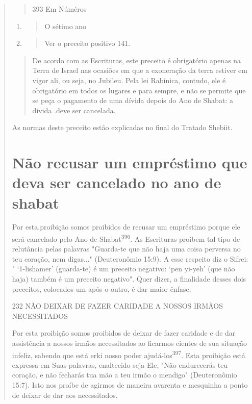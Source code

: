 \begin{quote}
\begin{quote}
393 Em Núméros
\end{quote}

\begin{enumerate}
\def\labelenumi{\arabic{enumi}.}
\setcounter{enumi}{393}
\item
 \begin{quote}
 O sétimo ano
 \end{quote}
\item
 \begin{quote}
 Ver o preceito positivo 141.
 \end{quote}
\end{enumerate}

\begin{quote}
De acordo com as Escrituras, este preceito é obrigatório apenas na Terra
de Israel nas ocasiões em que a exoneração da terra estiver em vigor
ali, ou seja, no Jubileu. Pela lei Rabínica, contudo, ele é obrigatório
em todos os lugares e para sempre, e não se permite que se peça o
pagamento de uma dívi­da depois do Ano de Shabat: a dívida .deve ser
cancelada.
\end{quote}

As normas deste preceito estão explicadas no final do Tratado Shebiit.


\section{Não recusar um empréstimo que deva ser cancelado no ano de shabat}

Por esta.proibição somos proibidos de recusar um empréstimo por­que ele
será cancelado pelo Ano de Shabat\textsuperscript{396}. As Escrituras
proíbem tal tipo de relutância pelas palavras "Guarda-te que não haja
uma coisa perversa no teu coração, nem digas..." (Deuteronômio 15:9). A
esse respeito diz o Sifrei: " `1-lis­hamer' (guarda-te) é um preceito
negativo: `pen yi-yeh' (que não haja) também é um preceito negativo".
Quer dizer, a finalidade desses dois preceitos, coloca­dos um após o
outro, é dar maior ênfase.

232 NÃO DEIXAR DE FAZER CARIDADE A NOSSOS IRMÃOS NECESSITADOS

Por esta proibição somos proibidos de deixar de fazer caridade e de dar
assistência a nossos irmãos necessitados ao ficarmos cientes de sua
situação infeliz, sabendo que está erki nosso poder
ajudá-los\textsuperscript{397}. Esta proibição está ex­pressa em Suas
palavras, enaltecido seja Ele, "Não endurecerás teu coração, e não
fecharás tua mão a teu irmão o mendigo" (Deuteronômio 15:7). Isto nos
proíbe de agirmos de maneira avarenta e mesquinha a ponto de deixar de
dar aos necessitados.


\end{quote}
